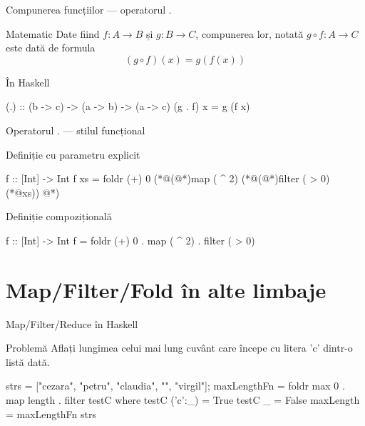 \documentclass[xcolor=pdftex,romanian,colorlinks]{beamer}
\begin{document}
\begin{frame}[fragile]{Compunerea funcțiilor --- operatorul $.$}
\begin{block}{Matematic}
Date fiind $f : A \rightarrow B$ și $g : B \rightarrow C$, compunerea lor, notată
$g \circ f : A \rightarrow C$ este dată de formula \[(g \circ f)(x) = g(f(x))\]
\end{block}

\begin{block}{În Haskell}
\begin{asciihs}
(.) :: (b -> c) -> (a -> b) -> (a -> c)
(g . f) x = g (f x)
\end{asciihs}
\end{block}
\end{frame}

\begin{frame}[fragile]{Operatorul $.$ --- stilul funcțional}
\begin{block}{Definiție cu parametru explicit}
\begin{asciihs}
f :: [Int] -> Int
f xs = foldr (+) 0 (*@\color{blue}(@*)map ( ^ 2)  (*@\color{blue}(@*)filter ( > 0) (*@\color{blue}xs)) @*)
\end{asciihs}
\end{block}

\begin{block}{Definiție compozițională}
\begin{asciihs}
f :: [Int] -> Int
f = foldr (+) 0 . map ( ^ 2) . filter ( > 0)
\end{asciihs}
\end{block}
\end{frame}




\section{Map/Filter/Fold în alte limbaje}

\begin{frame}[fragile]{Map/Filter/Reduce în Haskell}
\begin{block}{Problemă}
Aflați lungimea celui mai lung cuvânt care începe cu litera 'c' dintr-o listă dată.
\end{block}

\begin{asciihs}
strs = ["cezara", "petru", "claudia", "", "virgil"];
maxLengthFn = foldr max 0 . 
              map length . 
              filter testC
  where testC ('c':_) = True
        testC _       = False
maxLength = maxLengthFn strs
\end{asciihs}
\end{frame}
\end{document}
